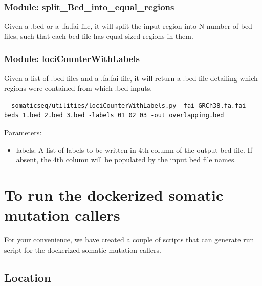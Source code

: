 \documentclass[10pt,letterpaper]{article}
\begin{document}
\begin{sloppypar}
\subsubsection{Module: split\_Bed\_into\_equal\_regions} \label{module:split_bed}

Given a .bed or a .fa.fai file, it will split the input region into N number of bed files, such that each bed file has equal-sized regions in them. 


\subsubsection{Module: lociCounterWithLabels}

Given a list of .bed files and a .fa.fai file, it will return a .bed file detailing which regions were contained from which .bed inputs. 

\begin{lstlisting}
  somaticseq/utilities/lociCounterWithLabels.py -fai GRCh38.fa.fai -beds 1.bed 2.bed 3.bed -labels 01 02 03 -out overlapping.bed
\end{lstlisting}

Parameters:

\begin{itemize}

\item labels: A list of labels to be written in 4th column of the output bed file. If absent, the 4th column will be populated by the input bed file names.

\end{itemize}


















\section{To run the dockerized somatic mutation callers} \label{dockerized_callers}

For your convenience, we have created a couple of scripts that can generate run script for the dockerized somatic mutation callers. 

\subsection{Location}


\end{sloppypar}
\end{document}
